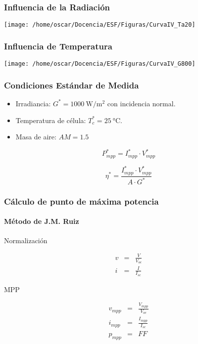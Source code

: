 \documentclass[xcolor=dvipsnames]{beamer}
\begin{document}
\begin{frame}[plain]
  \frametitle{Influencia de la Radiación}

  \begin{center}
    \texttt{[image: /home/oscar/Docencia/ESF/Figuras/CurvaIV\_Ta20]}
    \par\end{center}


\end{frame}

\begin{frame}[plain]
  \frametitle{Influencia de Temperatura}

  \begin{center}
    \texttt{[image: /home/oscar/Docencia/ESF/Figuras/CurvaIV\_G800]}
    \par\end{center}


\end{frame}

\begin{frame}
  \frametitle{Condiciones Estándar de Medida}
  \begin{itemize}
  \item Irradiancia: $G^{*}=\SI{1000}{\watt\per\meter\squared}$ con
    incidencia normal.
  \item Temperatura de célula: $T_{c}^{*}=\SI{25}{\celsius}$.
  \item Masa de aire: $AM=1.5$\end{itemize}
  \begin{block} {}

\[
P_{mpp}^{*}=I_{mpp}^{*}\cdot V_{mpp}^{*}\]


\[
\eta^{*}=\frac{I_{mpp}^{*}\cdot V_{mpp}^{*}}{A\cdot G^{*}}\]


\end{block}

\end{frame}

\begin{frame}[plain]
  \frametitle{Cálculo de punto de máxima potencia}


  \framesubtitle{Método de J.M. Ruiz}
  \begin{block} {Normalización}

\begin{eqnarray*}
  v & = & \frac{V}{V_{oc}}\\
  i & = & \frac{I}{I_{sc}}\end{eqnarray*}


\end{block} {}
\begin{block} {MPP}

\begin{eqnarray*}
  v_{mpp} & = & \frac{V_{mpp}}{V_{oc}}\\
  i_{mpp} & = & \frac{I_{mpp}}{I_{sc}}\\
  p_{mpp} & = & FF\end{eqnarray*}


\end{block}

\end{frame}
\end{document}

